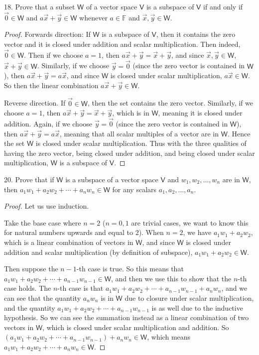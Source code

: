\documentclass[11pt]{article}
\newcommand{\br}[1]{\left(#1\right)}
\begin{document}
18. Prove that a subset $\mathsf{W}$ of a vector space $\mathsf{V}$ is a subspace of $\mathsf{V}$ if and only if $\vec{0}\in\mathsf{W}$ and $a\vec{x}+\vec{y}\in \mathsf{W}$ whenever $a\in\mathbb{F}$ and $\vec{x},\vec{y}\in\mathsf{W}$.

\begin{proof}
    Forwards direction: If $\mathsf{W}$ is a subspace of $\mathsf{V}$, then it contains the zero vector and it is closed under addition and scalar multiplication. Then indeed, $\vec{0}\in\mathsf{W}$. Then if we choose $a = 1$, then $a\vec{x}+\vec{y} = \vec{x}+\vec{y}$, and since $\vec{x},\vec{y}\in\mathsf{W}$, $\vec{x}+\vec{y}\in\mathsf{W}$. Similarly, if we choose $\vec{y} = \vec{0}$ (since the zero vector is contained in $\mathsf{W}$), then $a\vec{x}+\vec{y} = a\vec{x}$, and since $\mathsf{W}$ is closed under scalar multiplication, $a\vec{x}\in\mathsf{W}$. So then the linear combination $a\vec{x}+\vec{y}\in\mathsf{W}$.

    Reverse direction. If $\vec{0}\in\mathsf{W}$, then the set contains the zero vector. Similarly, if we choose $a = 1$, then $a\vec{x}+\vec{y} = \vec{x}+\vec{y}$, which is in $\mathsf{W}$, meaning it is closed under addition. Again, if we choose $\vec{y} = \vec{0}$ (since the zero vector is contained in $\mathsf{W}$), then $a\vec{x}+\vec{y} = a\vec{x}$, meaning that all scalar multiples of a vector are in $\mathsf{W}$. Hence the set $\mathsf{W}$ is closed under scalar multiplication. Thus with the three qualities of having the zero vector, being closed under addition, and being closed under scalar multiplication, $\mathsf{W}$ is a subspace of $\mathsf{V}$.
\end{proof}

20. Prove that if $\mathsf{W}$ is a subspace of a vector space $\mathsf{V}$ and $w_1, w_2, \dots, w_n$ are in $\mathsf{W}$, then $a_1w_1 + a_2w_2 + \cdots + a_nw_n \in \mathsf{W}$ for any scalars $a_1,a_2,\dots,a_n$.

\begin{proof}
    Let us use induction. 
    
    Take the base case where $n=2$ ($n=0,1$ are trivial cases, we want to know this for natural numbers upwards and equal to $2$). When $n=2$, we have $a_1w_1 + a_2w_2$, which is a linear combination of vectors in $\mathsf{W}$, and since $\mathsf{W}$ is closed under addition and scalar multiplication (by definition of subspace), $a_1w_1 + a_2w_2\in\mathsf{W}$. 
    
    Then suppose the $n-1$-th case is true. So this means that $a_1w_1 + a_2w_2 + \cdots + a_{n-1}w_{n-1} \in \mathsf{W}$, and then we use this to show that the $n$-th case holds. The $n$-th case is that $a_1w_1 + a_2w_2 + \cdots + a_{n-1}w_{n-1}+  a_nw_n$, and we can see that the quantity $a_nw_n$ is in $\mathsf{W}$ due to closure under scalar multiplication, and the quantity $a_1w_1 + a_2w_2 + \cdots + a_{n-1}w_{n-1}$ is as well due to the inductive hypothesis. So we can see the summation instead as a linear combination of two vectors in $\mathsf{W}$, which is closed under scalar multiplication and addition. So $\br{a_1w_1 + a_2w_2 + \cdots + a_{n-1}w_{n-1}} + a_nw_n \in \mathsf{W}$, which means $a_1w_1 + a_2w_2 + \cdots + a_nw_n \in \mathsf{W}$. 
\end{proof}
\end{document}
